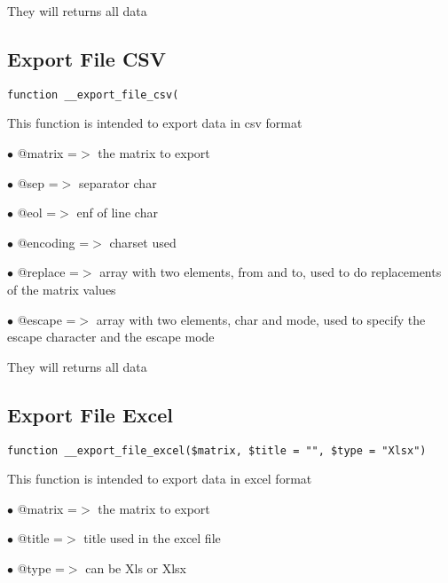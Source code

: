 \documentclass[a4paper]{book}
\begin{document}
They will returns all data

\hypertarget{toc124}{}
\subsection{Export File CSV}

\begin{lstlisting}
function __export_file_csv(
\end{lstlisting}

This function is intended to export data in csv format

\begin{compactitem}
\item[\color{myblue}$\bullet$] @matrix   =$>$ the matrix to export
\item[\color{myblue}$\bullet$] @sep      =$>$ separator char
\item[\color{myblue}$\bullet$] @eol      =$>$ enf of line char
\item[\color{myblue}$\bullet$] @encoding =$>$ charset used
\item[\color{myblue}$\bullet$] @replace  =$>$ array with two elements, from and to, used to do replacements of the matrix values
\item[\color{myblue}$\bullet$] @escape   =$>$ array with two elements, char and mode, used to specify the escape character and the
             escape mode
\end{compactitem}

They will returns all data

\hypertarget{toc125}{}
\subsection{Export File Excel}

\begin{lstlisting}
function __export_file_excel($matrix, $title = "", $type = "Xlsx")
\end{lstlisting}

This function is intended to export data in excel format

\begin{compactitem}
\item[\color{myblue}$\bullet$] @matrix =$>$ the matrix to export
\item[\color{myblue}$\bullet$] @title  =$>$ title used in the excel file
\item[\color{myblue}$\bullet$] @type   =$>$ can be Xls or Xlsx
\end{compactitem}
\end{document}

